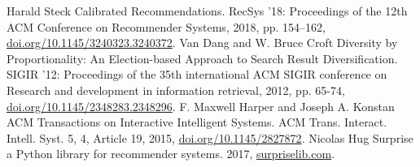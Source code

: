 \documentclass[a4paper,article,14pt]{extarticle}
\begin{document}


\tableofcontents
\pagebreak


\pagebreak


\pagebreak






\pagebreak

\begin{thebibliography}{1}
 Harald Steck \flqq Calibrated Recommendations\frqq. RecSys '18: Proceedings of the 12th ACM Conference on Recommender Systems, 2018, pp. 154–162, \href{https://doi.org/10.1145/3240323.3240372}{doi.org/10.1145/3240323.3240372}.
 Van Dang and W. Bruce Croft \flqq Diversity by Proportionality: An Election-based Approach to Search Result Diversification\frqq. SIGIR '12: Proceedings of the 35th international ACM SIGIR conference on Research and development in information retrieval, 2012, pp. 65-74, \href{https://doi.org/10.1145/2348283.2348296}{doi.org/10.1145/2348283.2348296}.
 F. Maxwell Harper and Joseph A. Konstan \flqq ACM Transactions on Interactive Intelligent Systems\frqq. ACM Trans. Interact. Intell. Syst. 5, 4, Article 19, 2015, \href{https://doi.org/10.1145/2827872}{doi.org/10.1145/2827872}.
 Nicolas Hug \flqq Surprise a Python library for recommender systems\frqq. 2017, \href{http://surpriselib.com}{surpriselib.com}.
\end{thebibliography}
\end{document}
